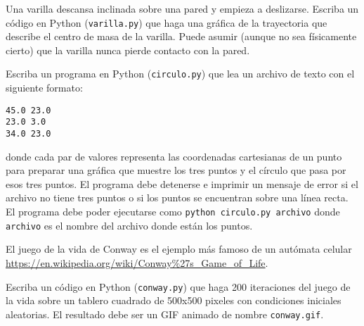 \documentclass[11pt,letterpaper]{exam}
\begin{document}
\begin{questions}
 

Una varilla descansa inclinada sobre una pared y empieza a
deslizarse. Escriba un c\'odigo en Python (\verb"varilla.py") que haga
una gr\'afica de la trayectoria que describe el centro de masa de la
varilla. Puede asumir (aunque no sea f\'isicamente cierto) que la
varilla nunca pierde contacto con la pared. 



Escriba un programa en Python (\verb"circulo.py") que lea un archivo de
texto con el siguiente formato:

\begin{verbatim}
45.0 23.0
23.0 3.0
34.0 23.0
\end{verbatim}
%
donde cada par de valores representa las coordenadas cartesianas de un
punto para preparar una gr\'afica que muestre los tres puntos y el
c\'irculo que pasa por esos tres puntos. El programa debe detenerse e
imprimir un mensaje de error si el archivo no tiene tres puntos o si
los puntos se encuentran sobre una l\'inea recta. El programa debe
poder ejecutarse como \verb"python circulo.py archivo" donde
\verb"archivo" es el nombre del archivo donde est\'an los puntos. 


El juego de la vida de Conway es el ejemplo m\'as famoso de un
aut\'omata celular
\url{https://en.wikipedia.org/wiki/Conway%27s_Game_of_Life}.

Escriba un c\'odigo en Python (\verb"conway.py") que haga 200
iteraciones del juego de la vida sobre un tablero cuadrado de 500x500
pixeles con condiciones iniciales aleatorias. El resultado debe ser un
GIF animado de nombre \verb"conway.gif".
 


\end{questions}
\end{document}
